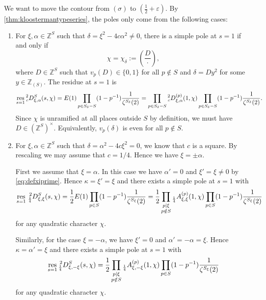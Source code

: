 \documentclass[10pt,oneside,reqno]{amsart}
\newcommand\ZZ{\mathbb{Z}}
\DeclareMathOperator\res{res}
\newcommand\legendresymbol[2]{\genfrac{(}{)}{}{}{#1}{#2}}
\theoremstyle{THEOREM}
\theoremstyle{DEFINITION}
\theoremstyle{EXERCISE}
\numberwithin{equation}{section}
\begin{document}
We want to move the contour from $(\sigma)$ to $(\frac12+\varepsilon)$. By \autoref{thm:kloostermantypeseries}, the poles only come from the following cases:
\begin{enumerate}[itemsep=0pt,parsep=0pt,topsep=0pt,leftmargin=0pt,labelsep=2.5pt,itemindent=9pt,label=\textbullet]
  \item For $\xi,\alpha\in \ZZ^S$ such that $\delta=\xi^2-4c\alpha^2\neq 0$, there is a simple pole at $s=1$ if and only if 
      \begin{equation}\label{eq:defchidelta}
      \chi=\chi_\delta:=\legendresymbol{D}{\cdot},
      \end{equation}
      where $D\in \ZZ^S$ such that $v_p(D)\in \{0,1\}$ for all $p\notin S$ and $\delta=Dy^2$ for some $y\in \ZZ_{(S)}$. The residue at $s=1$ is 
      \[
      \res_{s=1}\prescript{2}{c}D_{\xi,\alpha}^S(s,\chi)=E(1)\prod_{p\in S_\delta-S}(1-p^{-1})\frac{1}{\zeta^{S_\delta}(2)}=\prod_{p\in S_\delta-S}\prescript{2}{c}D_{\xi,\alpha}^{(p)}(1,\chi)\prod_{p\in S_\delta-S}(1-p^{-1})\frac{1}{\zeta^{S_\delta}(2)}.
      \]
      Since $\chi$ is unramified at all places outside $S$ by definition, we must have $D\in (\ZZ^S)^\times$. Equivalently, $v_p(\delta)$ is even for all $p\notin S$. 
      
  \item For $\xi,\alpha\in \ZZ^S$ such that $\delta=\alpha^2-4c \xi^2=0$, we know that $c$ is a square. By rescaling we may assume that $c=1/4$. Hence we have $\xi=\pm\alpha$.
      
      First we assume that $\xi=\alpha$. In this case we have $\alpha'= 0$ and $\xi'=\xi\neq 0$ by \eqref{eq:defxiprime}. Hence $\kappa=\xi'=\xi$ and there exists a simple pole at $s=1$ with 
      \[
      \res_{s=1}{}\prescript{2}{\frac14}D_{\xi,\xi}^S(s,\chi)=\frac12E(1)\prod_{p\in S}(1-p^{-1})\frac{1}{\zeta^{S_{\xi}}(2)}=\frac12\prod_{\substack{p\mid \xi\\ p\notin S}}\prescript{}{\frac14}A_{\xi,\xi}^{(p)}(1,\chi)\prod_{p\in S}(1-p^{-1})\frac{1}{\zeta^{S_{\xi}}(2)}
      \]
      for any quadratic character $\chi$.
      
      Similarly, for the case $\xi=-\alpha$, we have $\xi'=0$ and $\alpha'=-\alpha=\xi$. Hence $\kappa=\alpha'=\xi$ and there exists a simple pole at $s=1$ with 
      \[
      \res_{s=1}\prescript{2}{\frac14}D_{\xi,-\xi}^S(s,\chi)=\frac12\prod_{\substack{p\mid \xi\\ p\notin S}}\prescript{}{\frac14}A_{\xi,-\xi}^{(p)}(1,\chi)\prod_{p\in S}(1-p^{-1})\frac{1}{\zeta^{S_{\xi}}(2)}
      \]
      for any quadratic character $\chi$.
\end{enumerate} 
\end{document}
